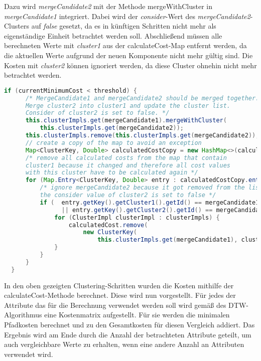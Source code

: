 Dazu wird \emph{mergeCandidate2} mit der Methode mergeWithCluster in \emph{mergeCandidate1} integriert.
Dabei wird der \emph{consider}-Wert des \emph{mergeCandidate2}-Clusters auf \emph{false} gesetzt,
da es in künftigen Schritten nicht mehr als eigenständige Einheit betrachtet werden soll.
Abschließend müssen alle berechneten Werte mit \emph{cluster1} aus der calculateCost-Map entfernt werden,
da die aktuellen Werte aufgrund der neuen Komponente nicht mehr gültig sind.
Die Kosten mit \emph{cluster2} können ignoriert werden, da diese Cluster ohnehin nicht mehr betrachtet werden.
\begin{lstlisting}[language=Java, caption=Cluster-Methode: Mergevorgang.]
  if (currentMinimumCost < threshold) {
      /* MergeCandidate1 and mergeCandidate2 should be merged together.
      Merge cluster2 into cluster1 and update the cluster list.
      Consider of cluster2 is set to false. */
      this.clusterImpls.get(mergeCandidate1).mergeWithCluster(
          this.clusterImpls.get(mergeCandidate2));  
      this.clusterImpls.remove(this.clusterImpls.get(mergeCandidate2));
      // create a copy of the map to avoid an exception
      Map<ClusterKey, Double> calculatedCostCopy = new HashMap<>(calculatedCost); 
      /* remove all calculated costs from the map that contain
      cluster1 because it changed and therefore all cost values
      with this cluster have to be calculated again */
      for (Map.Entry<ClusterKey, Double> entry : calculatedCostCopy.entrySet()) {
          /* ignore mergeCandidate2 because it got removed from the list and
          the consider value of cluster2 is set to false */
          if (  entry.getKey().getCluster1().getId() == mergeCandidate1
                || entry.getKey().getCluster2().getId() == mergeCandidate1) {
              for (ClusterImpl clusterImpl : clusterImpls) {
                  calculatedCost.remove(
                      new ClusterKey(
                          this.clusterImpls.get(mergeCandidate1), clusterImpl));
              }
          }
      }
  }
\end{lstlisting}
In den oben gezeigten Clustering-Schritten wurden die Kosten mithilfe der calculateCost-Methode berechnet.
Diese wird nun vorgestellt.
Für jedes der Attribute das für die Berechnung verwendet werden soll wird gemäß des \ac{DTW}-Algorithmus
eine Kostenmatrix aufgestellt.
Für sie werden die minimalen Pfadkosten berechnet und zu den Gesamtkosten für diesen Vergleich addiert.
Das Ergebnis wird am Ende durch die Anzahl der betrachteten Attribute geteilt,
um auch vergleichbare Werte zu erhalten, wenn eine andere Anzahl an Attributen verwendet wird.
